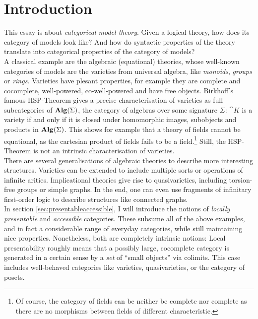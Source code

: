 \section*{Introduction}
{}

This essay is about \emph{categorical model theory}. Given a logical theory, how does its category of models look like? And how do syntactic properties of the theory translate into categorical properties of the category of models? \\

A classical example are the algebraic (equational) theories, whose well-known categories of models are the varieties from universal algebra, like \emph{monoids}, \emph{groups} or \emph{rings}. Varieties have plesant properties, for example they are complete and cocomplete, well-powered, co-well-powered and have free objects. Birkhoff's famous HSP-Theorem gives a precise characterisation of varieties as full subcategories of $\mathbf{Alg}(\Sigma)$, the category of algebras over some signature $\Sigma$: $\cat K$ is a variety if and only if it is closed under homomorphic images, subobjects and products in $\mathbf{Alg}(\Sigma)$. 
This shows for example that a theory of fields cannot be equational, as the cartesian product of fields fails to be a field.\footnote{Of course, the category of fields can be neither be complete nor complete as there are no morphisms between fields of different characteristic.}
Still, the HSP-Theorem is not an intrinsic characterisation of varieties. \\

There are several generalisations of algebraic theories to describe more interesting structures. Varieties can be extended to include multiple sorts or operations of infinite arities. Implicational theories give rise to quasivarieties, including torsion-free groups or simple graphs. In the end, one can even use fragments of infinitary first-order logic to describe structures like connected graphs. \\

In section \ref{sec:presentableaccessible}, I will introduce the notions of \emph{locally presentable} and \emph{accessible} categories. These subsume all of the above examples, and in fact a considerable range of everyday categories, while still maintaining nice properties. Nonetheless, both are completely intrinsic notions: Local presentability roughly means that a possibly large, cocomplete category is generated in a certain sense by a \emph{set} of ``small objects'' via colimits. This case includes well-behaved categories like varieties, quasivarieties, or the category of posets. \\

